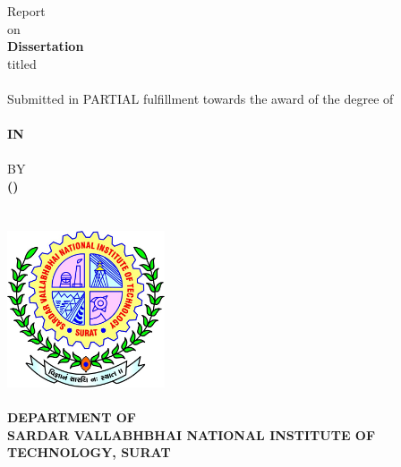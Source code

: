 
\thispagestyle{empty}
\BgThispage{}
\begin{center}
    \Large Report 
    \\\vspace{2pt}
    \normalsize on 
    \\\vspace{4pt}
    \textbf{\Large{\DegreeShort{} Dissertation}}
    \\\vspace{4pt}
    titled
    \\\vspace{8pt}
\Large
\textbf{\MakeUppercase{\Title{}}}
    \\\vspace{10pt}
    \normalsize Submitted in PARTIAL fulfillment towards the award of the degree of \\\vspace{7pt}
    \Large \textbf{\MakeUppercase{\Degree{}}\\ \normalsize IN\\\vspace{-5pt}\Large \MakeUppercase{\Subject{}}}\\\vspace{5pt}
   \normalsize BY
    \\\vspace{2pt}
    \Large \textbf{\Atitle{} \Author{} (\MakeUppercase{\Rollno{}})}
\\\vspace{12pt}
    \normalsize {}
\\\vspace{5pt}
\\\vspace{10pt}
\includegraphics[width=0.35\textwidth]{assets/logo.jpg}
\vspace{5pt}\\
\large \Year{}\\\vspace{5pt}
\Large
\textbf{DEPARTMENT OF \MakeUppercase{\Subject}\\\vspace{2pt}
SARDAR VALLABHBHAI NATIONAL INSTITUTE OF TECHNOLOGY, SURAT}
\end{center}
\setcounter{page}{0}
\newpage